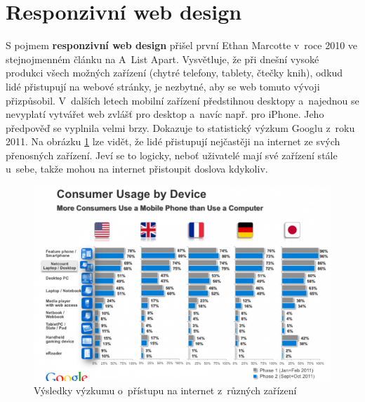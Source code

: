 \documentclass[thesis=B,czech]{FITthesis}[2012/06/26]
\begin{document}
\section{Responzivní web design} \label{sec:rd}


S pojmem \textbf{responzivní web design} přišel první Ethan Marcotte v~roce 2010 ve stejnojmenném článku na  A~List Apart. Vysvětluje, že při dnešní vysoké produkci všech možných zařízení (chytré telefony, tablety, čtečky knih), odkud lidé přistupují na webové stránky, je nezbytné, aby se web tomuto vývoji  přizpůsobil. V~dalších letech mobilní zařízení předstihnou desktopy a~najednou se nevyplatí vytvářet web zvlášť pro desktop a~navíc např. pro iPhone\cite{res}. Jeho předpověď se vyplnila velmi brzy. Dokazuje to statistický výzkum Googlu z~roku 2011. Na obrázku \ref{imgStatG} lze vidět, že lidé přistupují nejčastěji na internet ze svých přenosných zařízení. Jeví se to logicky, neboť uživatelé mají své zařízení stále u~sebe, takže mohou na internet přistoupit doslova kdykoliv.

\begin{figure}[h]
	\begin{center}
	\includegraphics[scale=0.7]{images/image01.png}
	\end{center}
	\caption{Výsledky výzkumu o~přístupu na internet z~různých zařízení\cite{dev}}
	\label{imgStatG}
\end{figure}
\end{document}
